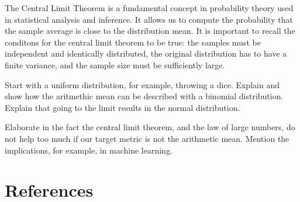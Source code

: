 The Central Limit Theorem is a fundamental concept in probability theory used in statistical analysis and inference. It allows us to compute the probability that the sample average is close to the distribution mean. It is important to recall the conditons for the central limit theorem to be true: the samples must be independent and identically distributed, the original distribution has to have a finite variance, and the sample size must be sufficiently large.

\begin{example}
{\color{red} Start with a uniform distribution, for example, throwing a dice. Explain and show how the aritmethic mean can be described with a binomial distribution. Explain that going to the limit results in the normal distribution.}
\end{example}

{\color{red} Elaborate in the fact the central limit theorem, and the law of large numbers, do not help too much if our target metric is not the arithmetic mean. Mention the implications, for example, in machine learning.}

%
%
\section*{References}






